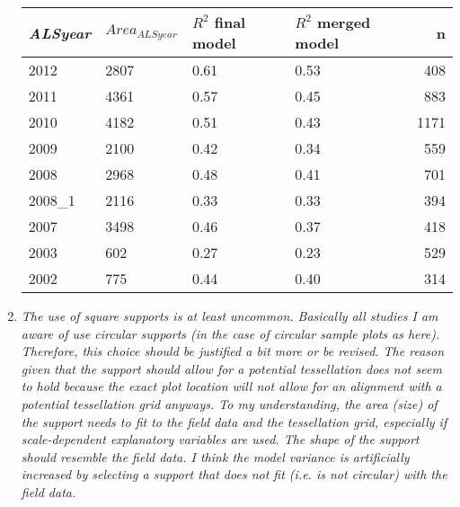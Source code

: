 \documentclass{article}
\begin{document}
\begin{enumerate}
  	\begin{table}[ht]
  		\centering
  		\begin{tabular}{llllr}
  			\hline
  			\textit{ALSyear} & $Area_{ALSyear}$ & $R^2$ final model & $R^2$ merged model & n \\ 
  			\hline
  			2012 & 2807  & 0.61 & 0.53 &  408 \\ 
  			2011 & 4361  & 0.57 & 0.45 &  883 \\ 
  			2010 & 4182  & 0.51 & 0.43 &  1171 \\ 
  			2009 & 2100  & 0.42 & 0.34 &  559 \\ 
  			2008 & 2968  & 0.48 & 0.41 &  701 \\ 
  		 2008\_1 & 2116  & 0.33 & 0.33 &  394 \\ 
  			2007 & 3498  & 0.46 & 0.37 &  418 \\ 
  			2003 & 602   & 0.27 & 0.23 &  529 \\ 
  			2002 & 775   & 0.44 & 0.40 &  314 \\ 
  			\hline
  			\hline
  		\end{tabular}
  	\end{table}
  
  
  \item \textit{The use of square supports is at least uncommon. Basically all studies I am aware of use circular supports (in the case of circular sample plots as here). Therefore, this choice should be justified a bit more or be revised. The reason given that the support should allow for a potential tessellation does not seem to hold because the exact plot location will not allow for an alignment with a potential tessellation grid anyways. To my understanding, the area (size) of the support needs to fit to the field data and the tessellation grid, especially if scale-dependent explanatory variables are used. The shape of the support should resemble the field data. I think the model variance is artificially increased by selecting a support that does not fit (i.e. is not circular) with the field data.}
  

\end{enumerate}
\end{document}
